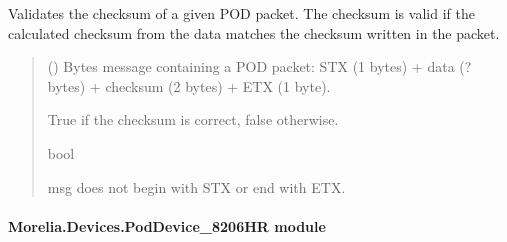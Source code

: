 \documentclass[letterpaper,10pt,english]{sphinxmanual}
\begin{document}
\begin{fulllineitems}
\begin{fulllineitems}
\label{\detokenize{Morelia.Devices:Morelia.Devices.BasicPodProtocol.Pod._ValidateChecksum}}
\pysigstartsignatures
{}
\pysigstopsignatures
\sphinxAtStartPar
Validates the checksum of a given POD packet. The checksum is valid if the calculated checksum
from the data matches the checksum written in the packet.
\begin{quote}\begin{description}
\sphinxAtStartPar
{} () \textendash{} Bytes message containing a POD packet: STX (1 bytes) + data (? bytes) + checksum                 (2 bytes) + ETX (1 byte).

\sphinxAtStartPar
True if the checksum is correct, false otherwise.

\sphinxAtStartPar
bool

\sphinxAtStartPar
{} \textendash{} msg does not begin with STX or end with ETX.

\end{description}\end{quote}

\end{fulllineitems}


\end{fulllineitems}



\paragraph{Morelia.Devices.PodDevice\_8206HR module}
\label{\detokenize{Morelia.Devices:module-Morelia.Devices.PodDevice_8206HR}}\label{\detokenize{Morelia.Devices:morelia-devices-poddevice-8206hr-module}}
\end{document}
